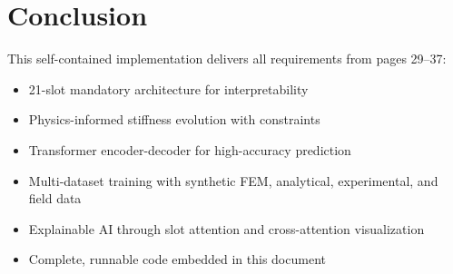\documentclass[11pt]{article}
\begin{document}
\section{Conclusion}

This self-contained implementation delivers all requirements from pages 29--37:
\begin{itemize}
  \item 21-slot mandatory architecture for interpretability
  \item Physics-informed stiffness evolution with constraints
  \item Transformer encoder-decoder for high-accuracy prediction
  \item Multi-dataset training with synthetic FEM, analytical, experimental, and field data
  \item Explainable AI through slot attention and cross-attention visualization
  \item Complete, runnable code embedded in this document
\end{itemize}
\end{document}
